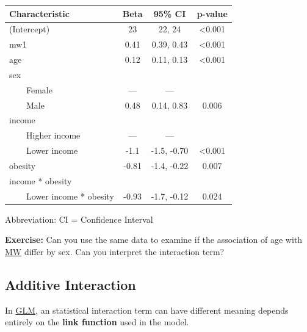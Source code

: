 \documentclass[
]{book}
\begin{document}
\begin{table}[t]
\fontsize{12.0pt}{14.0pt}\selectfont
\begin{tabular*}{\linewidth}{@{\extracolsep{\fill}}lccc}
\toprule
\textbf{Characteristic} & \textbf{Beta} & \textbf{95\% CI} & \textbf{p-value} \\ 
\midrule\addlinespace[2.5pt]
(Intercept) & 23 & 22, 24 & <0.001 \\ 
mw1 & 0.41 & 0.39, 0.43 & <0.001 \\ 
age & 0.12 & 0.11, 0.13 & <0.001 \\ 
sex &  &  &  \\ 
    Female & — & — &  \\ 
    Male & 0.48 & 0.14, 0.83 & 0.006 \\ 
income &  &  &  \\ 
    Higher income & — & — &  \\ 
    Lower income & -1.1 & -1.5, -0.70 & <0.001 \\ 
obesity & -0.81 & -1.4, -0.22 & 0.007 \\ 
income * obesity &  &  &  \\ 
    Lower income * obesity & -0.93 & -1.7, -0.12 & 0.024 \\ 
\bottomrule
\end{tabular*}
\begin{minipage}{\linewidth}
\vspace{.05em}
Abbreviation: CI = Confidence Interval\\
\end{minipage}
\end{table}

\textbf{Exercise:} Can you use the same data to examine if the association of age with \hyperref[acronyms_MW]{MW} differ by sex. Can you interpret the interaction term?

\subsection{Additive Interaction}\label{additive-interaction}

In \hyperref[acronyms_GLM]{GLM}, an statistical interaction term can have different meaning depends entirely on the \textbf{link function} used in the model.
\end{document}
